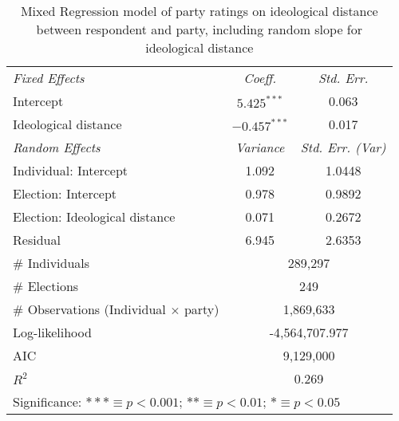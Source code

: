 \begin{table}[h]
	\centering
	\caption{Mixed Regression model of party ratings on ideological distance between respondent and party, including random slope for ideological distance}
	\label{mreg}
	\begin{tabular}{lcc}
		\toprule
		\textit{Fixed Effects} & \textit{Coeff.} & \textit{Std. Err.}\\
		Intercept & $5.425^{***}$ & 0.063 \\
		Ideological distance & $-0.457^{***}$&  0.017 \\ \midrule
		\textit{Random Effects} & \textit{Variance }& \textit{Std. Err. (Var)}\\
		Individual: Intercept&     1.092 & 1.0448 \\
		Election: Intercept  & 0.978 & 0.9892 \\
		Election: Ideological distance & 0.071 & 0.2672 \\
		Residual & 6.945 & 2.6353 \\ \midrule
		\# Individuals & \multicolumn{2}{c}{289,297} \\
		\# Elections  & \multicolumn{2}{c}{249} \\
		\# Observations (Individual $\times$ party)  &  \multicolumn{2}{c}{1,869,633}    \\ \midrule
		Log-likelihood & \multicolumn{2}{c}{-4,564,707.977} \\
		AIC & \multicolumn{2}{c}{9,129,000} \\
		$R^2$& \multicolumn{2}{c}{0.269} \\
		\bottomrule
		\multicolumn{3}{p{.7\linewidth}}{Significance: 
			$*** \equiv p < 0{.}001$; 
			$** \equiv p < 0{.}01$; 
			$* \equiv p < 0{.}05$}\\
	\end{tabular}
\end{table}